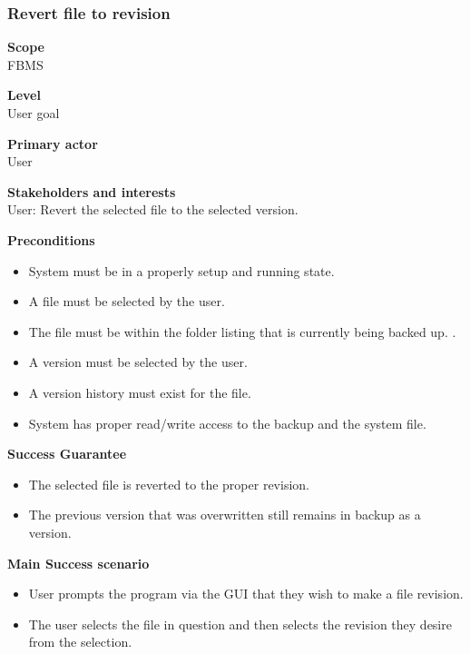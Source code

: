 \documentclass[12pt,a4paper]{article}
\begin{document}
\subsubsection{Revert file to revision}
\begin{description}
	\item \textbf{Scope} \\
		FBMS
	\item \textbf{Level} \\
		User goal
	\item \textbf{Primary actor} \\
		User 
	\item \textbf{Stakeholders and interests} \\
		User: Revert the selected file to the selected version. 
	\item \textbf{Preconditions} \\
		\begin{itemize}
		\item System must be in a properly setup and running state. 
		\item A file must be selected by the user. 
		\item The file must be within the folder listing that is currently being backed up. .
		\item A version must be selected by the user. 
		\item A version history must exist for the file. 
		\item System has proper read/write access to the backup and the system file. 
		\end{itemize}
	\item \textbf{Success Guarantee} \\
		\begin{itemize}
		\item The selected file is reverted to the proper revision. 
		\item The previous version that was overwritten still remains in backup as a version. 
		\end{itemize}
	\item \textbf{Main Success scenario} \vspace{-4ex} \\
	\begin{itemize}
		\item User prompts the program via the GUI that they wish to make a file revision. 
		\item The user selects the file in question and then selects the revision they desire from the selection. 

\end{itemize}
\end{description}
\end{document}
